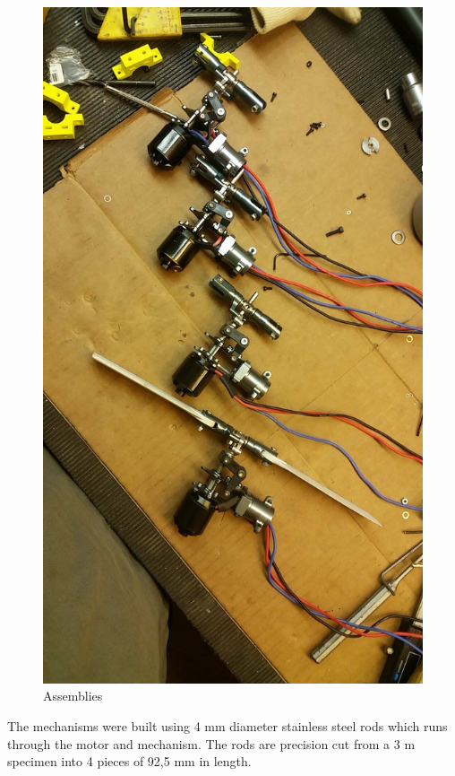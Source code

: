 \begin{figure}[h]
\begin{minipage}[b]{0.35\textwidth}
            \includegraphics[width = \textwidth]{VAPIQ-PICTURES/VPQassemblies}
            \caption{Assemblies}
            \label{fig:}
        \end{minipage}
\end{figure}

\noindent The mechanisms were built using 4 mm diameter stainless steel rods which runs through the motor and mechanism. The rods are precision cut from a 3 m specimen into 4 pieces of 92,5 mm in length. 

